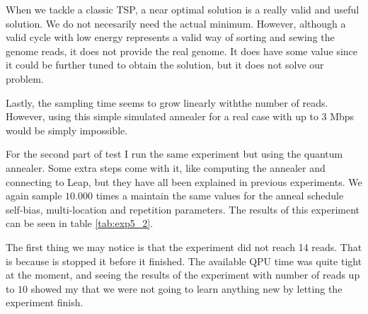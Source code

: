 When we tackle a classic TSP, a near optimal solution is a really valid and useful solution. We do not necesarily need the actual minimum. However, although a valid cycle with low energy represents a valid way of sorting and sewing the genome reads, it does not provide the real genome. It does have some value since it could be further tuned to obtain the solution, but it does not solve our problem.

Lastly, the sampling time seems to grow linearly withthe number of reads. However, using this simple simulated annealer for a real case with up to 3 Mbps would be simply impossible.

For the second part of test  I run the same experiment but using the quantum annealer. Some extra steps come with it, like computing the annealer and connecting to Leap, but they have all been explained in previous experiments. We again sample $10.000$ times a maintain the same values for the anneal schedule self-bias, multi-location and repetition parameters. The results of this experiment can be seen in table \ref{tab:exp5_2}.

\begin{table}[H]
	\centering
	\caption{Results of experiment 5, $10.000$ reads using the quantum annealer.}
	\label{tab:exp5_2}
\end{table}

The first thing we may notice is that the experiment did not reach 14 reads. That is because is stopped it before it finished. The available QPU time was quite tight at the moment, and seeing the results of the experiment with number of reads up to $10$ showed my that we were not going to learn anything new by letting the experiment finish.

